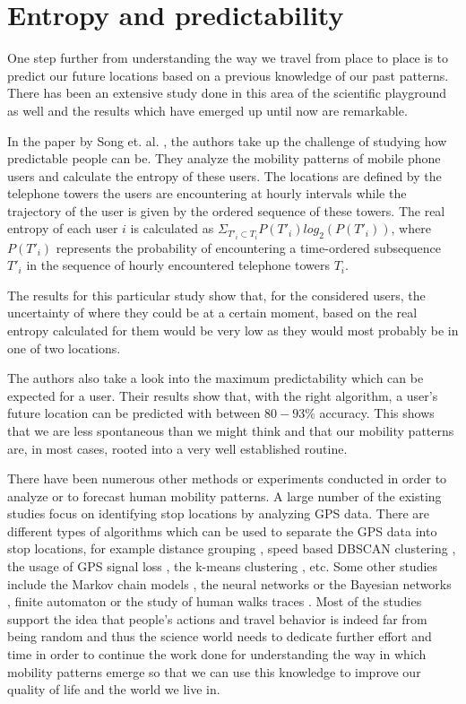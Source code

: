 \section{Entropy and predictability}
One step further from understanding the way we travel from place to place is to
predict our future locations based on a previous knowledge of our past patterns.
There has been an extensive study done in this area of the scientific playground
as well and the results which have emerged up until now are remarkable.

In the paper by Song et. al. \cite{Barabasi10}, the authors take up the
challenge of studying how predictable people can be. They analyze the mobility
patterns of mobile phone users and calculate the entropy of these users. The
locations are defined by the telephone towers the users are encountering at
hourly intervals while the trajectory of the user is given by the ordered
sequence of these towers. The real entropy of each user $i$ is calculated as
$\Sigma _{T'_{i}\subset T_{i}} P(T'_{i})log_{2}(P(T'_{i}))$, where $P(T'_{i})$
represents the probability of encountering a time-ordered subsequence $T'_{i}$
in the sequence of hourly encountered telephone towers $T_{i}$.

The results for this particular study show that, for the considered users, the
uncertainty of where they could be at a certain moment, based on the real
entropy calculated for them would be very low as they would most probably be in
one of two locations.

The authors also take a look into the maximum predictability which can be
expected for a user. Their results show that, with the right algorithm, a user's
future location can be predicted with between $80-93\%$ accuracy. This shows
that we are less spontaneous than we might think and that our mobility patterns
are, in most cases, rooted into a very well established routine.

There have been numerous other methods or experiments conducted in order to
analyze or to forecast human mobility patterns. A large number of the existing
studies focus on identifying stop locations by analyzing GPS data. There are
different types of algorithms which can be used to separate the GPS data into
stop locations, for example distance grouping \cite{cuttone2014inferring}, speed
based DBSCAN clustering \cite{Palma:2008:CAD:1363686.1363886}, the usage of GPS
signal loss \cite{Cao:2010:MSS:1920841.1920968}, the k-means clustering
\cite{Ashbrook:2003:UGL:945305.945310}, etc. Some other studies include the
Markov chain models \cite{Ross09} \cite{Liu96}, the neural networks
\cite{Liou03} or the Bayesian networks \cite{Akoush07}, finite automaton
\cite{Petzold04} or the study of human walks traces \cite{5061995}
\cite{4509740}. Most of the studies support the idea that people's actions and
travel behavior is indeed far from being random and thus the science world needs
to dedicate further effort and time in order to continue the work done for
understanding the way in which mobility patterns emerge so that we can use this
knowledge to improve our quality of life and the world we live in.
